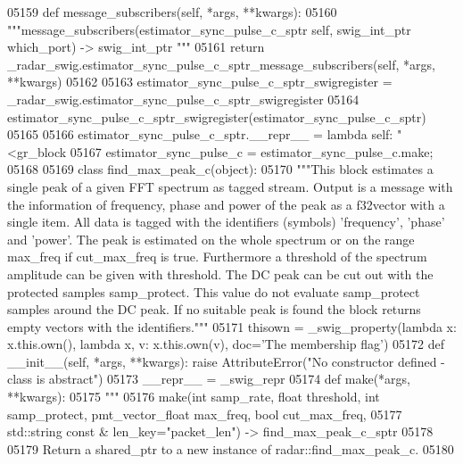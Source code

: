 \begin{DoxyCode}
{{{{{{{{{{{{{{{{{05159     \textcolor{keyword}{def }message_subscribers(self, *args, **kwargs):
05160         \textcolor{stringliteral}{"""message\_subscribers(estimator\_sync\_pulse\_c\_sptr self, swig\_int\_ptr which\_port) -> swig\_int\_ptr
      """}
05161         \textcolor{keywordflow}{return} \_radar\_swig.estimator\_sync\_pulse\_c\_sptr\_message\_subscribers(self, *args, **kwargs)
05162 
05163 estimator\_sync\_pulse\_c\_sptr\_swigregister = \_radar\_swig.estimator\_sync\_pulse\_c\_sptr\_swigregister
05164 estimator_sync_pulse_c_sptr_swigregister(estimator\_sync\_pulse\_c\_sptr)
05165 
05166 estimator\_sync\_pulse\_c\_sptr.\_\_repr\_\_ = \textcolor{keyword}{lambda} self: \textcolor{stringliteral}{"<gr\_block %
05167 estimator\_sync\_pulse\_c = estimator\_sync\_pulse\_c.make;
05168 
05169 \textcolor{keyword}{class }find_max_peak_c(object):
05170     \textcolor{stringliteral}{"""This block estimates a single peak of a given FFT spectrum as tagged stream. Output is a message
       with the information of frequency, phase and power of the peak as a f32vector with a single item. All data is
       tagged with the identifiers (symbols) 'frequency', 'phase' and 'power'. The peak is estimated on the whole
       spectrum or on the range max\_freq if cut\_max\_freq is true. Furthermore a threshold of the spectrum amplitude
       can be given with threshold. The DC peak can be cut out with the protected samples samp\_protect. This value
       do not evaluate samp\_protect samples around the DC peak. If no suitable peak is found the block returns empty
       vectors with the identifiers."""}
05171     thisown = _swig_property(\textcolor{keyword}{lambda} x: x.this.own(), \textcolor{keyword}{lambda} x, v: x.this.own(v), doc=\textcolor{stringliteral}{'The membership flag'})
05172     \textcolor{keyword}{def }__init__(self, *args, **kwargs): \textcolor{keywordflow}{raise} AttributeError(\textcolor{stringliteral}{"No constructor defined - class is abstract"})
05173     \_\_repr\_\_ = \_swig\_repr
05174     \textcolor{keyword}{def }make(*args, **kwargs):
05175         \textcolor{stringliteral}{"""}
05176 \textcolor{stringliteral}{        make(int samp\_rate, float threshold, int samp\_protect, pmt\_vector\_float max\_freq, bool
       cut\_max\_freq, }
05177 \textcolor{stringliteral}{            std::string const & len\_key="packet\_len") -> find\_max\_peak\_c\_sptr}
05178 \textcolor{stringliteral}{}
05179 \textcolor{stringliteral}{        Return a shared\_ptr to a new instance of radar::find\_max\_peak\_c.}
05180 \textcolor{stringliteral}{}
}}}}}}}}}}}}}}}}}}
\end{DoxyCode}
